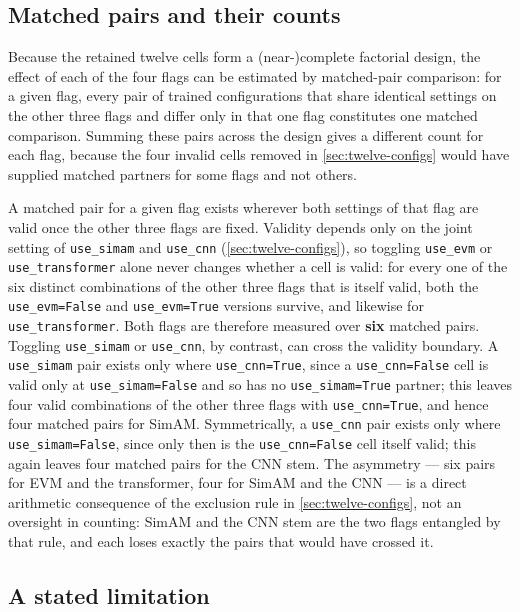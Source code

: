 \subsection{Matched pairs and their counts}
\label{sec:matched-pairs}

Because the retained twelve cells form a (near-)complete factorial design, the effect of each of the four flags can be estimated by matched-pair comparison: for a given flag, every pair of trained configurations that share identical settings on the other three flags and differ only in that one flag constitutes one matched comparison. Summing these pairs across the design gives a different count for each flag, because the four invalid cells removed in \autoref{sec:twelve-configs} would have supplied matched partners for some flags and not others.

A matched pair for a given flag exists wherever both settings of that flag are valid once the other three flags are fixed. Validity depends only on the joint setting of \texttt{use\_simam} and \texttt{use\_cnn} (\autoref{sec:twelve-configs}), so toggling \texttt{use\_evm} or \texttt{use\_transformer} alone never changes whether a cell is valid: for every one of the six distinct combinations of the other three flags that is itself valid, both the \texttt{use\_evm=False} and \texttt{use\_evm=True} versions survive, and likewise for \texttt{use\_transformer}. Both flags are therefore measured over \textbf{six} matched pairs. Toggling \texttt{use\_simam} or \texttt{use\_cnn}, by contrast, can cross the validity boundary. A \texttt{use\_simam} pair exists only where \texttt{use\_cnn=True}, since a \texttt{use\_cnn=False} cell is valid only at \texttt{use\_simam=False} and so has no \texttt{use\_simam=True} partner; this leaves four valid combinations of the other three flags with \texttt{use\_cnn=True}, and hence four matched pairs for SimAM. Symmetrically, a \texttt{use\_cnn} pair exists only where \texttt{use\_simam=False}, since only then is the \texttt{use\_cnn=False} cell itself valid; this again leaves four matched pairs for the CNN stem. The asymmetry --- six pairs for EVM and the transformer, four for SimAM and the CNN --- is a direct arithmetic consequence of the exclusion rule in \autoref{sec:twelve-configs}, not an oversight in counting: SimAM and the CNN stem are the two flags entangled by that rule, and each loses exactly the pairs that would have crossed it.

\subsection{A stated limitation}
\label{sec:design-limitation}

